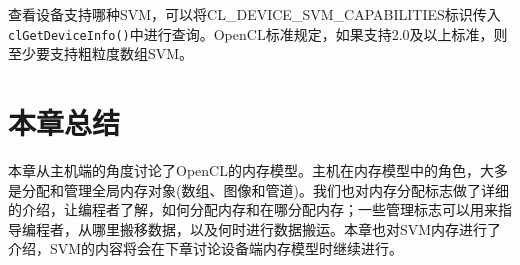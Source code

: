 查看设备支持哪种SVM，可以将CL\_\allowbreak{}DEVICE\_\allowbreak{}SVM\_\allowbreak{}CAPABILITIES标识传入\texttt{clGetDeviceInfo()}中进行查询。OpenCL标准规定，如果支持2.0及以上标准，则至少要支持粗粒度数组SVM。



\section{本章总结}

本章从主机端的角度讨论了OpenCL的内存模型。主机在内存模型中的角色，大多是分配和管理全局内存对象(数组、图像和管道)。我们也对内存分配标志做了详细的介绍，让编程者了解，如何分配内存和在哪分配内存；一些管理标志可以用来指导编程者，从哪里搬移数据，以及何时进行数据搬运。本章也对SVM内存进行了介绍，SVM的内容将会在下章讨论设备端内存模型时继续进行。


